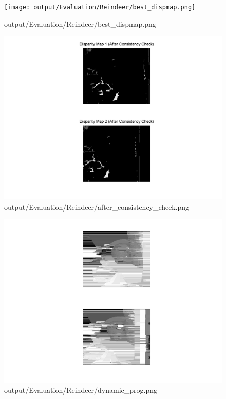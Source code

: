 \begin{figure}[h]    \texttt{[image: output/Evaluation/Reindeer/best\_dispmap.png]}    \caption{output/Evaluation/Reindeer/best\_dispmap.png}\end{figure}
\begin{figure}[h]    \includegraphics[scale=0.5]{output/Evaluation/Reindeer/after_consistency_check.png}    \caption{output/Evaluation/Reindeer/after\_consistency\_check.png}\end{figure}
\begin{figure}[h]    \includegraphics[scale=0.5]{output/Evaluation/Reindeer/dynamic_prog.png}    \caption{output/Evaluation/Reindeer/dynamic\_prog.png}\end{figure}
